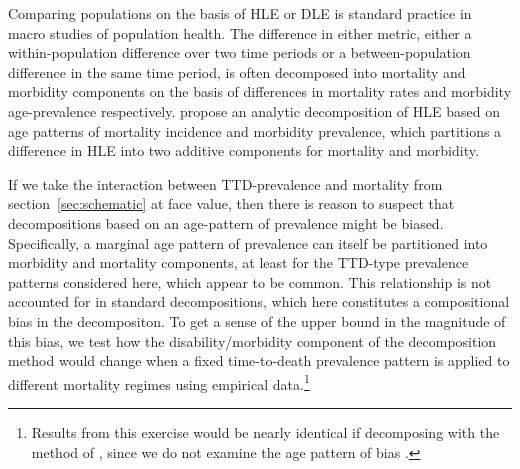\documentclass[12pt,oneside,letterpaper,doublespacing]{article}  %
\begin{document}
Comparing populations on the basis of HLE or DLE is standard practice in macro studies of population
health. The difference in either metric, either a within-population difference
over two time periods or a between-population difference in the same time
period, is often decomposed into mortality and morbidity components on the basis
of differences in mortality rates and morbidity age-prevalence respectively.
\citet{Andreev2002} propose an analytic decomposition of HLE based on age patterns of mortality
incidence and morbidity prevalence, which partitions a difference in HLE into
two additive components for mortality and morbidity.


If we take the interaction between TTD-prevalence and mortality from
section~\ref{sec:schematic} at face value, then there is reason to suspect that
decompositions based on an age-pattern of prevalence might be biased.
Specifically, a marginal age pattern of prevalence can itself be partitioned
into morbidity and mortality components, at least for the TTD-type prevalence
patterns considered here, which appear to be common.
This relationship is not accounted for in standard decompositions, which here constitutes a compositional bias in the decompositon.
To get a sense of the upper bound in the magnitude of this bias, we test how the disability/morbidity
component of the \citet{Andreev2002} decomposition method would change when a fixed time-to-death
prevalence pattern is applied to different mortality regimes using empirical data.\footnote{Results from this exercise would be nearly identical if decomposing with the method of \citet{Nusselder2004}, since we do not examine the age pattern of bias \citep{shkolnikov2017}.} %
\end{document}
